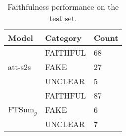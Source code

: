 \documentclass[letterpaper]{article} \usepackage{aaai18}  \usepackage{times}  \usepackage{helvet}  \usepackage{courier}  \usepackage{url}  \usepackage{graphicx}  \usepackage{amsfonts}
\begin{document}
	\begin{table}
		\centering
		\begin{tabular}{l|ll}
			\hline
			Model                    & Category    & Count \\ \hline
			\multirow{3}{*}{att-s2s} & FAITHFUL       & 68    \\
			& FAKE & 27    \\
			& UNCLEAR  & 5     \\ \hline
			\multirow{3}{*}{FTSum$_g$}   & FAITHFUL       & 87    \\
			& FAKE & 6     \\
			& UNCLEAR  & 7     \\ \hline
		\end{tabular}
		\caption{Faithfulness performance on the test set.}
		\label{tb:validation}
	\end{table}
	
\end{document}
